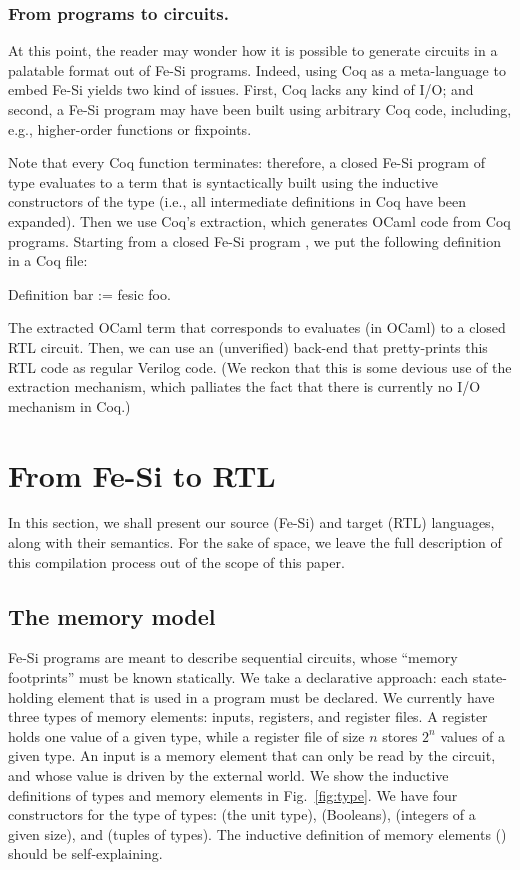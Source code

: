 \documentclass{llncs}
\begin{document}
\subsubsection{From programs to circuits.} At this point, the reader
may wonder how it is possible to generate circuits in a palatable
format out of Fe-Si programs. Indeed, using Coq as a meta-language to
embed Fe-Si yields two kind of issues. First, Coq lacks any kind of
I/O; and second, a Fe-Si program may have been built using arbitrary
Coq code, including, e.g., higher-order functions or fixpoints.

Note that every Coq function terminates: therefore, a closed Fe-Si
program of type  evaluates to a term that is
syntactically built using the inductive constructors of the type
 (i.e., all intermediate definitions in Coq have been expanded).
%
Then we use Coq's extraction, which generates OCaml code from Coq
programs.  
%
Starting from a closed Fe-Si program , we put the following
definition in a Coq file:
\begin{mcoq}
Definition bar := fesic foo.  
\end{mcoq}
The extracted OCaml term that corresponds to  evaluates (in
OCaml) to a closed RTL circuit. Then, we can use an (unverified)
back-end that pretty-prints this RTL code as regular Verilog code.
%
(We reckon that this is some devious use of the extraction mechanism,
which palliates the fact that there is currently no I/O mechanism in
Coq.)

\section{From Fe-Si to RTL}

In this section, we shall present our source (Fe-Si) and target (RTL)
languages, along with their semantics. For the sake of space, we leave
the full description of this compilation process out of the scope of
this paper.

\subsection{The memory model}
Fe-Si programs are meant to describe sequential circuits, whose
``memory footprints'' must be known statically. We take a declarative
approach: each state-holding element that is used in a program must be
declared. 
%
We currently have three types of memory elements: inputs, registers,
and register files. A register holds one value of a given type, while a
register file of size $n$ stores $2^n$ values of a given type. 
%
An input is a memory element that can only be read by the circuit,
and whose value is driven by the external world.
%
We show the inductive definitions of types and memory elements in
Fig.~\ref{fig:type}. 
%
We have four constructors for the type  of types: 
(the unit type),  (Booleans),  (integers of a given
size), and  (tuples of types). The inductive definition of
memory elements () should be self-explaining. 
\end{document}
